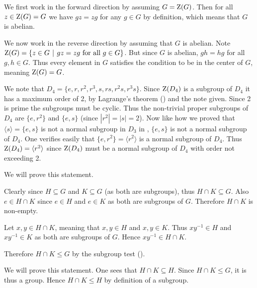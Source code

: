 \begin{questions}
\begin{partquestions}{\alph*}
        \item We first work in the forward direction by assuming $G = \mathrm{Z}(G)$. Then for all $z \in \mathrm{Z}(G) = G$ we have $gz = zg$ for any $g \in G$ by definition, which means that $G$ is abelian.

        We now work in the reverse direction by assuming that $G$ is abelian. Note $\CenterGrp{G} = \{z \in G \vert gz = zg \text{ for all } g \in G\}$. But since $G$ is abelian, $gh = hg$ for all $g, h \in G$. Thus every element in $G$ satisfies the condition to be in the center of $G$, meaning $\mathrm{Z}(G) = G$.

        \item We note that $D_4 = \{e, r, r^2, r^3, s, rs, r^2s, r^3s\}$. Since $\mathrm{Z}(D_4)$ is a subgroup of $D_4$ it has a maximum order of 2, by Lagrange's theorem () and the note given. Since 2 is prime the subgroups must be cyclic. Thus the non-trivial proper subgroups of $D_4$ are $\{e, r^2\}$ and $\{e, s\}$ (since $|r^2| = |s| = 2$). Now like how we proved that $\langle s \rangle = \{e, s\}$ is not a normal subgroup in $D_3$ in , $\{e, s\}$ is not a normal subgroup of $D_4$. One verifies easily that $\{e, r^2\} = \langle r^2 \rangle$ is a normal subgroup of $D_4$. Thus $\mathrm{Z}(D_4) = \langle r^2 \rangle$ since $\mathrm{Z}(D_4)$ must be a normal subgroup of $D_4$ with order not exceeding 2.
    \end{partquestions}

    \item \begin{partquestions}{\alph*}
        \item We will prove this statement.

        Clearly since $H \subseteq G$ and $K \subseteq G$ (as both are subgroups), thus $H \cap K \subseteq G$. Also $e \in H \cap K$ since $e \in H$ and $e \in K$ as both are subgroups of $G$. Therefore $H \cap K$ is non-empty.

        Let $x, y \in H \cap K$, meaning that $x, y \in H$ and $x, y \in K$. Thus $xy^{-1} \in H$ and $xy^{-1} \in K$ as both are subgroups of $G$. Hence $xy^{-1} \in H \cap K$.

        Therefore $H \cap K \leq G$ by the subgroup test ().

        \item We will prove this statement. One sees that $H \cap K \subseteq H$. Since $H \cap K \leq G$, it is thus a group. Hence $H \cap K \leq H$ by definition of a subgroup.


\end{partquestions}
\end{questions}
